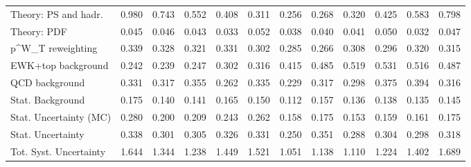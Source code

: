 \begin{tabular}{l|p{0.6cm}p{0.6cm}p{0.6cm}p{0.6cm}p{0.6cm}p{0.6cm}p{0.6cm}p{0.6cm}p{0.6cm}p{0.6cm}p{0.6cm}}
Theory: PS and hadr.                     & 0.980 & 0.743 & 0.552 & 0.408 & 0.311 & 0.256 & 0.268 & 0.320 & 0.425 & 0.583 & 0.798 \\
Theory: PDF                              & 0.045 & 0.046 & 0.043 & 0.033 & 0.052 & 0.038 & 0.040 & 0.041 & 0.050 & 0.032 & 0.047 \\
p^{W}_{T} reweighting                    & 0.339 & 0.328 & 0.321 & 0.331 & 0.302 & 0.285 & 0.266 & 0.308 & 0.296 & 0.320 & 0.315 \\
EWK+top background                       & 0.242 & 0.239 & 0.247 & 0.302 & 0.316 & 0.415 & 0.485 & 0.519 & 0.531 & 0.516 & 0.487 \\
QCD background                           & 0.331 & 0.317 & 0.355 & 0.262 & 0.335 & 0.229 & 0.317 & 0.298 & 0.375 & 0.394 & 0.316 \\
Stat. Background                         & 0.175 & 0.140 & 0.141 & 0.165 & 0.150 & 0.112 & 0.157 & 0.136 & 0.138 & 0.135 & 0.145 \\
Stat. Uncertainty (MC)                   & 0.280 & 0.200 & 0.209 & 0.243 & 0.262 & 0.158 & 0.175 & 0.153 & 0.159 & 0.161 & 0.175 \\
\hline
Stat. Uncertainty                        & 0.338 & 0.301 & 0.305 & 0.326 & 0.331 & 0.250 & 0.351 & 0.288 & 0.304 & 0.298 & 0.318 \\
\hline
Tot. Syst. Uncertainty                   & 1.644 & 1.344 & 1.238 & 1.449 & 1.521 & 1.051 & 1.138 & 1.110 & 1.224 & 1.402 & 1.689 \\
\hline
\end{tabular}
